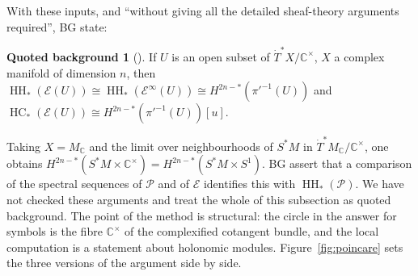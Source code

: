 \documentclass[11pt,oneside,reqno]{article}
\DeclareMathOperator{\HH}{HH}
\DeclareMathOperator{\HC}{HC}
\newcommand{\C}{\mathbb C}
\newcommand{\cE}{\mathcal E}
\newcommand{\cP}{\mathcal P}
\newcommand{\Tdot}{\dot T^*}
\theoremstyle{plain}
\theoremstyle{definition}
\newtheorem{background}[theorem]{Quoted background}
\theoremstyle{remark}
\begin{document}
With these inputs, and ``without giving all the detailed sheaf-theory arguments
required'', BG state:

\begin{background}[{\cite[\S5, Theorem]{BG}}]\label{bg:microthm}
If \(U\) is an open subset of \(\Tdot X/\C^\times\), \(X\) a complex manifold of dimension \(n\), then
\(\HH_*(\cE(U))\cong\HH_*(\cE^\infty(U))\cong H^{2n-*}(\pi'^{-1}(U))\) and
\(\HC_*(\cE(U))\cong H^{2n-*}(\pi'^{-1}(U))[u]\).
\end{background}

Taking \(X=M_{\C}\) and the limit over neighbourhoods of \(S^*M\) in \(\Tdot M_{\C}/\C^\times\), one
obtains \(H^{2n-*}(S^*M\times\C^\times)=H^{2n-*}(S^*M\times S^1)\). BG assert that a comparison of the
spectral sequences of \(\cP\) and of \(\cE\) identifies this with \(\HH_*(\cP)\). We have not checked
these arguments and treat the whole of this subsection as quoted background. The
point of the method is structural: the circle in the answer for symbols is the
fibre \(\C^\times\) of the complexified cotangent bundle, and the local computation is a
statement about holonomic modules. Figure~\ref{fig:poincare} sets the three
versions of the argument side by side.
\end{document}
